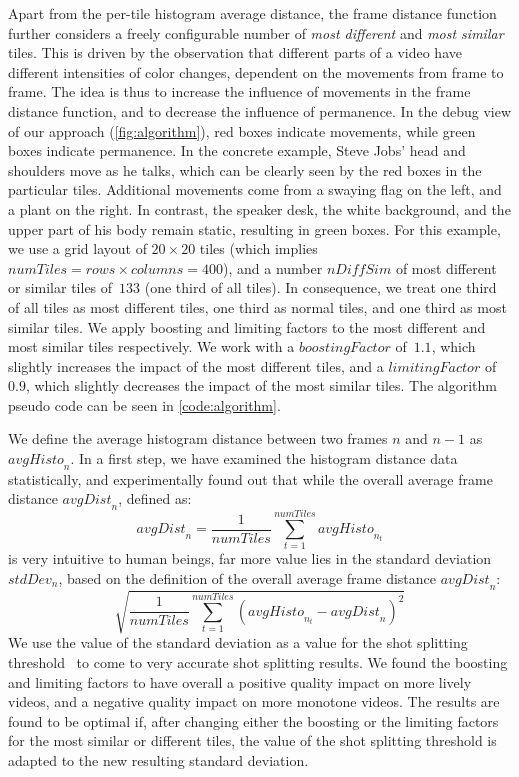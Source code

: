 \documentclass{acm_proc_article-sp}
\begin{document}
Apart from the per-tile histogram average distance, the frame distance function further considers a freely configurable number of \emph{most different} and \emph{most similar} tiles. This is driven by the observation that different parts of a video have different intensities of color changes, dependent on the movements from frame to frame. The idea is thus to increase the influence of movements in the frame distance function, and to decrease the influence of permanence. In the debug view of our approach (\autoref{fig:algorithm}), red boxes indicate movements, while green boxes indicate permanence. In the concrete example, Steve Jobs' head and shoulders move as he talks, which can be clearly seen by the red boxes in the particular tiles. Additional movements come from a swaying flag on the left, and a plant on the right. In contrast, the speaker desk, the white background, and the upper part of his body remain static, resulting in green boxes. For this example, we use a grid layout of $\mathit{20} \times \mathit{20}$ tiles (which implies $\mathit{numTiles} = \mathit{rows} \times \mathit{columns} = 400$), and a number $\mathit{nDiffSim}$ of most different or similar tiles of~$\mathit{133}$ (one third of all tiles). In consequence, we treat one third of all tiles as most different tiles, one third as normal tiles, and one third as most similar tiles. We apply boosting and limiting factors to the most different and most similar tiles respectively. We work with a $\mathit{boostingFactor}$ of~$\mathit{1.1}$, which slightly increases the impact of the most different tiles, and a $\mathit{limitingFactor}$ of~$\mathit{0.9}$, which slightly decreases the impact of the most similar tiles. The algorithm pseudo code can be seen in \autoref{code:algorithm}.

We define the average histogram distance between two frames $\mathit{n}$ and $\mathit{n - 1}$ as $\mathit{avgHisto}_{n}$. In a first step, we have examined the histogram distance data statistically, and experimentally found out that while the overall average frame distance $\mathit{avgDist}_{n}$, defined as: $$\mathit{avgDist}_{n} = \frac{1}{\mathit{numTiles}}\sum_{t=1}^{\mathit{numTiles}}\mathit{avgHisto}_{n_{t}}$$ is very intuitive to human beings, far more value lies in the standard deviation $\mathit{stdDev}_{n}$, based on the definition of the overall average frame distance $\mathit{avgDist}_{n}$: $$\sqrt{\frac{1}{\mathit{numTiles}}\sum_{t=1}^{\mathit{numTiles}}(\mathit{avgHisto}_{n_{t}} - \mathit{avgDist}_{n})^{2}}$$ We use the value of the standard deviation as a value for the shot splitting threshold~\cite{Lienhart1999} to come to very accurate shot splitting results. We found the boosting and limiting factors to have overall a positive quality impact on more lively videos, and a negative quality impact on more monotone videos. The results are found to be optimal if, after changing either the boosting or the limiting factors for the most similar or different tiles, the value of the shot splitting threshold is adapted to the new resulting standard deviation.
\end{document}
